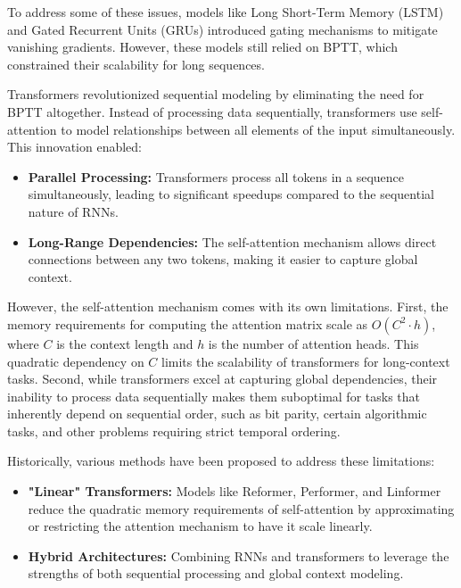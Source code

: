 \documentclass{article}
\begin{document}
To address some of these issues, models like Long Short-Term Memory (LSTM) and Gated Recurrent Units (GRUs) introduced gating mechanisms to mitigate vanishing gradients. However, these models still relied on BPTT, which constrained their scalability for long sequences.

Transformers revolutionized sequential modeling by eliminating the need for BPTT altogether. Instead of processing data sequentially, transformers use self-attention to model relationships between all elements of the input simultaneously. This innovation enabled:
\begin{itemize}
    \item \textbf{Parallel Processing:} Transformers process all tokens in a sequence simultaneously, leading to significant speedups compared to the sequential nature of RNNs.
    \item \textbf{Long-Range Dependencies:} The self-attention mechanism allows direct connections between any two tokens, making it easier to capture global context.
\end{itemize}

However, the self-attention mechanism comes with its own limitations. First, the memory requirements for computing the attention matrix scale as $O(C^2 \cdot h)$, where $C$ is the context length and $h$ is the number of attention heads. This quadratic dependency on $C$ limits the scalability of transformers for long-context tasks. Second, while transformers excel at capturing global dependencies, their inability to process data sequentially makes them suboptimal for tasks that inherently depend on sequential order, such as bit parity, certain algorithmic tasks, and other problems requiring strict temporal ordering.

Historically, various methods have been proposed to address these limitations:
\begin{itemize}
    \item \textbf{"Linear" Transformers:} Models like Reformer, Performer, and Linformer reduce the quadratic memory requirements of self-attention by approximating or restricting the attention mechanism to have it scale linearly.
    \item \textbf{Hybrid Architectures:} Combining RNNs and transformers to leverage the strengths of both sequential processing and global context modeling.
\end{itemize}
\end{document}
